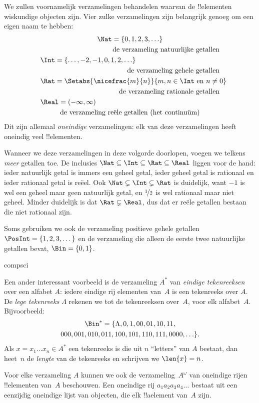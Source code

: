 \documentclass[../../../include/open-logic-section]{subfiles}
\begin{document}

\begin{ex}
We zullen voornamelijk verzamelingen behandelen waarvan de !!{element}en
wiskundige objecten zijn. Vier zulke verzamelingen zijn belangrijk genoeg
om een eigen naam te hebben:
\begin{multline*}
    \Nat = \{0, 1, 2, 3, \ldots\} \\
    \shoveright{\text{de verzameling natuurlijke getallen}}\\
    \shoveleft{\Int = \{\ldots, -2, -1, 0, 1, 2, \ldots\}} \\
    \shoveright{\text{de verzameling gehele getallen}}\\
    \shoveleft{\Rat = \Setabs{\nicefrac{m}{n}}{m, n \in \Int\text{ en }n \neq 0}}\\
    \shoveright{\text{de verzameling rationale getallen}}\\
    \shoveleft{\Real = (-\infty, \infty)}\\
    \text{de verzameling reële getallen (het continuüm)}
\end{multline*}
Dit zijn allemaal \emph{oneindige} verzamelingen: elk van deze verzamelingen
heeft oneindig veel !!{element}en.

Wanneer we deze verzamelingen in deze volgorde doorlopen, voegen we telkens
\emph{meer} getallen toe. De inclusies $\Nat \subseteq \Int
\subseteq \Rat \subseteq \Real$ liggen voor de hand: ieder natuurlijk
getal is immers een geheel getal, ieder geheel getal is rationaal en ieder
rationaal getal is reëel. Ook $\Nat \subsetneq \Int \subsetneq
\Rat$ is duidelijk, want $-1$ is wel een geheel maar geen natuurlijk getal,
en $\nicefrac{1}{2}$ is wel rationaal maar niet geheel. Minder duidelijk is
dat $\Rat \subsetneq \Real$, dus dat er reële getallen bestaan die niet
rationaal zijn.

Soms gebruiken we ook de verzameling positieve gehele getallen $\PosInt = \{1,
2, 3, \dots\}$ en de verzameling die alleen de eerste twee natuurlijke
getallen bevat, $\Bin = \{0, 1\}$.
\end{ex}

\begin{tagblock}{compsci}
\begin{ex}[Tekenreeksen]
Een ander interessant voorbeeld is de verzameling $A^{*}$ van \emph{eindige
tekenreeksen} over een alfabet $A$: iedere eindige rij elementen van~$A$
is een tekenreeks over $A$. De \emph{lege tekenreeks $\Lambda$} rekenen we
tot de tekenreeksen over~$A$, voor elk alfabet~$A$. Bijvoorbeeld:
\begin{multline*}
\Bin^*
=\{\Lambda,0,1,00,01,10,11,\\
000,001,010,011,100,101,110,111,0000,\ldots\}.
\end{multline*}
Als $x=x_{1}\ldots x_{n}\in A^{*}$ een tekenreeks is die uit $n$
``letters'' van $A$ bestaat, dan heet~$n$ de \emph{lengte} van de tekenreeks
en schrijven we $\len{x}=n$.
\end{ex}
\end{tagblock}

\begin{ex}
Voor elke verzameling $A$ kunnen we ook de verzameling~$A^\omega$ van
oneindige rijen !!{element}en van~$A$ beschouwen. Een oneindige rij
$a_1a_2a_3a_4\dots$ bestaat uit een eenzijdig oneindige lijst van objecten,
die elk !!a{element} van~$A$ zijn.
\end{ex}
\end{document}

